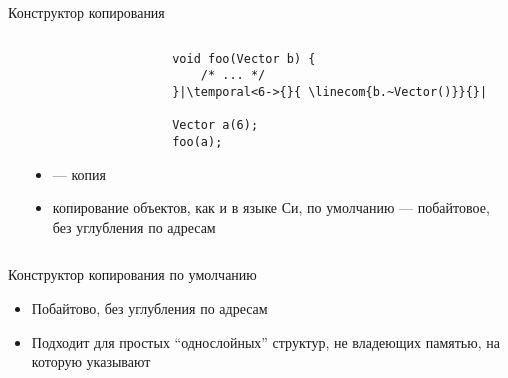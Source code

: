\documentclass[aspectratio=169,14pt]{beamer}
\begin{document}
\begin{frame}[fragile]{Конструктор копирования}
\begin{columns}[T]
\begin{column}{0.6\textwidth}
\begin{onlyenv}
                \end{onlyenv}
            \end{column}
            \begin{column}{0.4\textwidth}
                \begin{verbatim}
                    void foo(Vector b) {
                        /* ... */
                    }|\temporal<6->{}{ \linecom{b.~Vector()}}{}|

                    Vector a(6);
                    foo(a);
                \end{verbatim}
                \footnotesize
                \begin{itemize}
                    \item<2->  --- копия 
                    \item<2-> копирование объектов, как и в языке Си, по умолчанию --- побайтовое, без углубления по адресам
                \end{itemize}
            \end{column}
        \end{columns}
    \end{frame}


    \begin{frame}{Конструктор копирования по умолчанию}
        \begin{itemize}
            \item Побайтово, без углубления по адресам
            \item Подходит для простых ``однослойных'' структур, не владеющих памятью, на которую указывают
        \end{itemize}
    \end{frame}
\end{document}
